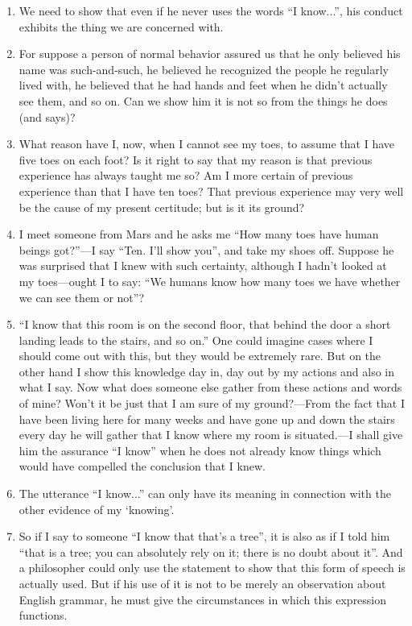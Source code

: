 \documentclass{book}
\begin{document}
\begin{enumerate}
\item
We need to show that even if he never uses the words ``I know...'', his conduct
exhibits the thing we are concerned with.

\item
For suppose a person of normal behavior assured us that he only believed his
name was such-and-such, he believed he recognized the people he regularly lived
with, he believed that he had hands and feet when he didn't actually see them,
and so on. Can we show him it is not so from the things he does (and says)?

\item
What reason have I, now, when I cannot see my toes, to assume that I have five
toes on each foot?  Is it right to say that my reason is that previous
experience has always taught me so? Am I more certain of previous experience
than that I have ten toes?  That previous experience may very well be the cause
of my present certitude; but is it its ground?

\item
I meet someone from Mars and he asks me ``How many toes have human beings
got?''---I say ``Ten. I'll show you'', and take my shoes off. Suppose he was
surprised that I knew with such certainty, although I hadn't looked at my
toes---ought I to say: ``We humans know how many toes we have whether we can
see them or not''?

\item
``I know that this room is on the second floor, that behind the door a short
landing leads to the stairs, and so on.'' One could imagine cases where I
should come out with this, but they would be extremely rare. But on the other
hand I show this knowledge day in, day out by my actions and also in what I
say.  Now what does someone else gather from these actions and words of mine?
Won't it be just that I am sure of my ground?---From the fact that I have been
living here for many weeks and have gone up and down the stairs every day he
will gather that I know where my room is situated.---I shall give him the
assurance ``I know'' when he does not already know things which would have
compelled the conclusion that I knew.

\item
The utterance ``I know...'' can only have its meaning in connection with the
other evidence of my `knowing'.

\item
So if I say to someone ``I know that that's a tree'', it is also as if I told
him ``that is a tree; you can absolutely rely on it; there is no doubt about
it''. And a philosopher could only use the statement to show that this form of
speech is actually used. But if his use of it is not to be merely an
observation about English grammar, he must give the circumstances in which this
expression functions.


\end{enumerate}
\end{document}
